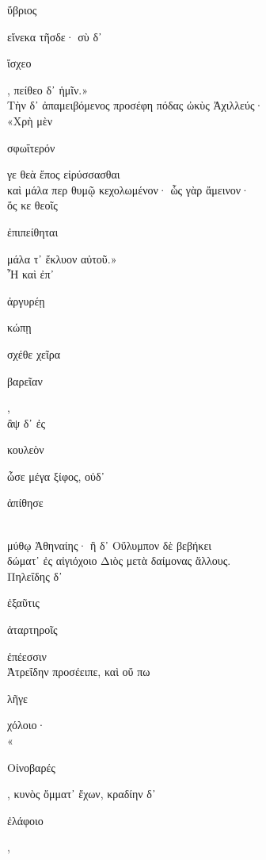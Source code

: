 \documentclass{ransom}
\begin{document}
\renewcommand{\rightheaderwhat}{\rightheaderwhatglosses}%
\begin{foreignpage}
\begin{graytext}
\begin{whitetext}ὕβριος\end{whitetext} εἵνεκα τῆσδε· σὺ δ᾽ \begin{whitetext}ἴσχεο\end{whitetext}, πείθεο δ᾽ ἡμῖν.»\\
Τὴν δ᾽ ἀπαμειβόμενος προσέφη πόδας ὠκὺς Ἀχιλλεύς·\hfill{}\\
«Χρὴ μὲν \begin{whitetext}σφωΐτερόν\end{whitetext} γε θεὰ ἔπος εἰρύσσασθαι\\
καὶ μάλα περ θυμῷ κεχολωμένον· ὧς γὰρ ἄμεινον·\\
ὅς κε θεοῖς \begin{whitetext}ἐπιπείθηται\end{whitetext} μάλα τ᾽ ἔκλυον αὐτοῦ.»\\
Ἦ καὶ ἐπ᾽ \begin{whitetext}ἀργυρέῃ\end{whitetext} \begin{whitetext}κώπῃ\end{whitetext} σχέθε χεῖρα \begin{whitetext}βαρεῖαν\end{whitetext},\\
ἂψ δ᾽ ἐς \begin{whitetext}κουλεὸν\end{whitetext} ὦσε μέγα ξίφος, οὐδ᾽ \begin{whitetext}ἀπίθησε\end{whitetext}\hfill{}\\
μύθῳ Ἀθηναίης· ἣ δ᾽ Οὔλυμπον δὲ βεβήκει\\
δώματ᾽ ἐς αἰγιόχοιο Διὸς μετὰ δαίμονας ἄλλους.\\
Πηλεΐδης δ᾽ \begin{whitetext}ἐξαῦτις\end{whitetext} \begin{whitetext}ἀταρτηροῖς\end{whitetext} ἐπέεσσιν\\
Ἀτρεΐδην προσέειπε, καὶ οὔ πω \begin{whitetext}λῆγε\end{whitetext} χόλοιο·\\
«\begin{whitetext}Οἰνοβαρές\end{whitetext}, κυνὸς ὄμματ᾽ ἔχων, κραδίην δ᾽ \begin{whitetext}ἐλάφοιο\end{whitetext},\hfill{}\\

\end{graytext}
\end{foreignpage}
\end{document}
